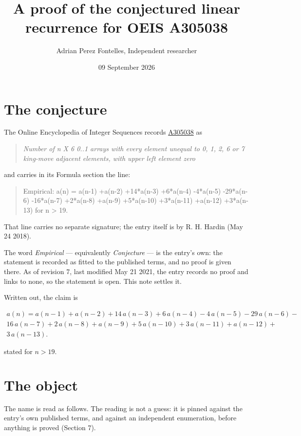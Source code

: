 \documentclass[11pt]{article}
\title{A proof of the conjectured linear recurrence for OEIS A305038}
\author{Adrian Perez Fontelles, Independent researcher}
\date{09 September 2026}
\theoremstyle{definition}
\begin{document}
\maketitle
\section{The conjecture}

The Online Encyclopedia of Integer Sequences records \href{https://oeis.org/A305038}{A305038} as

\begin{quote}\itshape Number of n X 6 0..1 arrays with every element unequal to 0, 1, 2, 6 or 7 king-move adjacent elements, with upper left element zero\end{quote}

and carries in its Formula section the line:

\begin{quote}\ttfamily Empirical: a(n) = a(n-1) +a(n-2) +14*a(n-3) +6*a(n-4) -4*a(n-5) -29*a(n-6) -16*a(n-7) +2*a(n-8) +a(n-9) +5*a(n-10) +3*a(n-11) +a(n-12) +3*a(n-13) for n > 19.\end{quote}

That line carries no separate signature; the entry itself is by R. H. Hardin (May 24 2018).

The word {\itshape Empirical} --- equivalently {\itshape Conjecture} --- is the entry's own: the statement is recorded as fitted to the published terms, and no proof is given there. As of revision 7, last modified May 21 2021, the entry records no proof and links to none, so the statement is open. This note settles it.

Written out, the claim is

\begin{multline*} a(n) = a(n-1) + a(n-2) + 14\,a(n-3) + 6\,a(n-4) - 4\,a(n-5) - 29\,a(n-6) - \\ 16\,a(n-7) + 2\,a(n-8) + a(n-9) + 5\,a(n-10) + 3\,a(n-11) + a(n-12) + \\ 3\,a(n-13). \end{multline*}

stated for $n > 19$.

\section{The object}

The name is read as follows. The reading is not a guess: it is pinned against the entry's own published terms, and against an independent enumeration, before anything is proved (Section 7).
\end{document}
